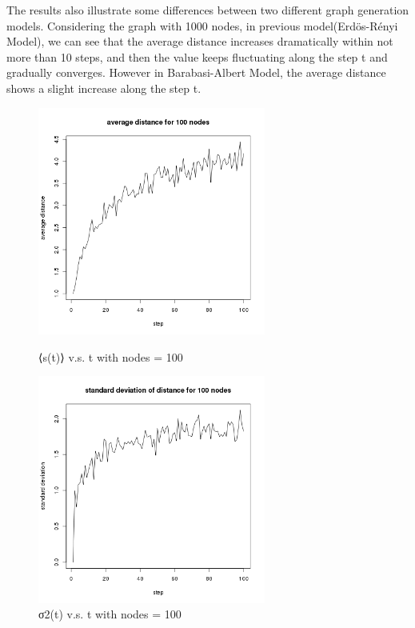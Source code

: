 \documentclass[draftcls,12pt,onecolumn]{IEEEtran}
\begin{document}
The results also illustrate some differences between two different graph generation models. Considering the graph with 1000 nodes, in previous model(Erdös-Rényi Model), we can see that the average distance increases dramatically within not more than 10 steps, and then the value keeps fluctuating along the step t and gradually converges. However in Barabasi-Albert Model, the average distance shows a slight increase along the step t.
\begin{figure}[htbp]
\centering
\begin{minipage}[t]{0.48\textwidth}
\centering
\includegraphics[width=7.5cm]{2_2_d_100_distance.png}
\caption{⟨s(t)⟩ v.s. t with nodes = 100}
\end{minipage}
\begin{minipage}[t]{0.48\textwidth}
\centering
\includegraphics[width=7.5cm]{2_2_d_100_deviation.png}
\caption{σ2(t) v.s. t with nodes = 100}
\end{minipage}
\end{figure}
\end{document}
